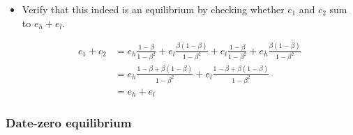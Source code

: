 \documentclass{scrartcl}
\begin{document}
\begin{itemize}
	\item Verify that this indeed is an equilibrium by checking whether $c_1$ and $c_2$ sum to $e_h+e_l$.
	
	\begin{align}
	c_1+c_2&=e_h\frac{1-\beta}{1-\beta^2}+e_l\frac{\beta(1-\beta)}{1-\beta^2}+e_l\frac{1-\beta}{1-\beta^2}+e_h\frac{\beta(1-\beta)}{1-\beta^2} \nonumber \\
	&= e_h \frac{1-\beta+\beta(1-\beta)}{1-\beta^2}+e_l \frac{1-\beta+\beta(1-\beta)}{1-\beta^2} \nonumber \\
	&=e_h+e_l
	\end{align}
		
\end{itemize}

\subsubsection*{Date-zero equilibrium}
\end{document}

